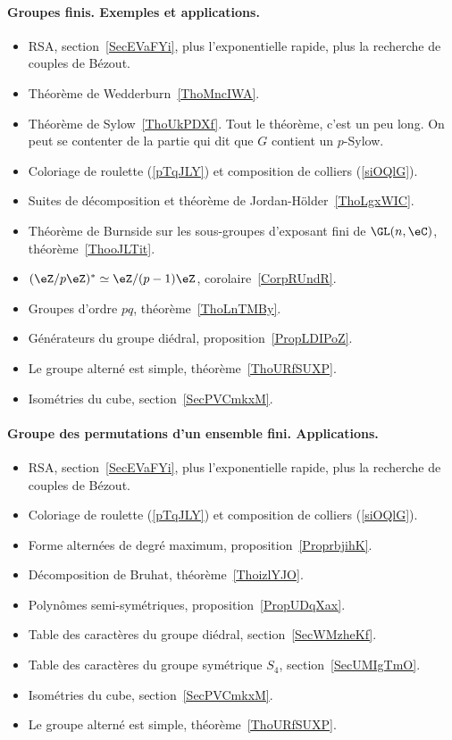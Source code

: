 \paragraph{Groupes finis. Exemples et applications.}
\begin{itemize}
    \item RSA, section~\ref{SecEVaFYi}, plus l'exponentielle rapide, plus la recherche de couples de Bézout.
    \item Théorème de Wedderburn~\ref{ThoMncIWA}.
    \item Théorème de Sylow~\ref{ThoUkPDXf}. Tout le théorème, c'est un peu long. On peut se contenter de la partie qui dit que \( G\) contient un \( p\)-Sylow.
    \item Coloriage de roulette (\ref{pTqJLY}) et composition de colliers (\ref{siOQlG}).
    \item Suites de décomposition et théorème de Jordan-Hölder~\ref{ThoLgxWIC}.
    \item Théorème de Burnside sur les sous-groupes d'exposant fini de \( \GL(n,\eC)\), théorème~\ref{ThooJLTit}.
    \item \( (\eZ/p\eZ)^*\simeq \eZ/(p-1)\eZ\), corolaire~\ref{CorpRUndR}.
    \item Groupes d'ordre \( pq\), théorème~\ref{ThoLnTMBy}.
    \item Générateurs du groupe diédral, proposition~\ref{PropLDIPoZ}.
    \item Le groupe alterné est simple, théorème~\ref{ThoURfSUXP}.
    \item Isométries du cube, section~\ref{SecPVCmkxM}.
\end{itemize}
\paragraph{Groupe des permutations d'un ensemble fini. Applications.}
\begin{itemize}
    \item RSA, section~\ref{SecEVaFYi}, plus l'exponentielle rapide, plus la recherche de couples de Bézout.
    \item Coloriage de roulette (\ref{pTqJLY}) et composition de colliers (\ref{siOQlG}).
    \item Forme alternées de degré maximum, proposition~\ref{ProprbjihK}.
    \item Décomposition de Bruhat, théorème~\ref{ThoizlYJO}.
    \item Polynômes semi-symétriques, proposition~\ref{PropUDqXax}.
    \item Table des caractères du groupe diédral, section~\ref{SecWMzheKf}.
    \item Table des caractères du groupe symétrique \( S_4\), section~\ref{SecUMIgTmO}.
    \item Isométries du cube, section~\ref{SecPVCmkxM}.
    \item Le groupe alterné est simple, théorème~\ref{ThoURfSUXP}.
\end{itemize}
